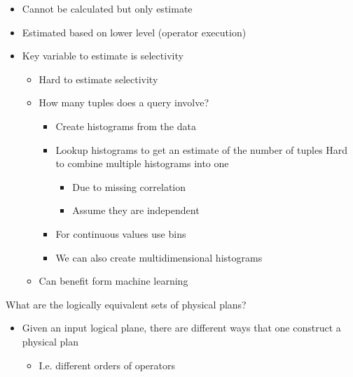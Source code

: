 \begin{itemize}
\begin{itemize}
            \item Cannot be calculated but only estimate
            \item Estimated based on lower level (operator execution)
            \item Key variable to estimate is selectivity
                \begin{itemize}
                    \item Hard to estimate selectivity
                \end{itemize}
                \begin{itemize}
                    \item How many tuples does a query involve?
                        \begin{itemize}
                            \item Create histograms from the data
                            \item Lookup histograms to get an estimate of the number of tuples
                            \icon Hard to combine multiple histograms into one
                                \begin{itemize}
                                    \item Due to missing correlation
                                    \item Assume they are independent
                                \end{itemize}
                            \item For continuous values use bins
                            \item We can also create multidimensional histograms
                        \end{itemize}
                    \item Can benefit form machine learning
                \end{itemize}
        \end{itemize}
     What are the logically equivalent sets of physical plans?
        \begin{itemize}
            \item Given an input logical plane, there are different ways that one construct a physical plan
                \begin{itemize}
                    \item I.e. different orders of operators
                \end{itemize}

\end{itemize}
\end{itemize}

